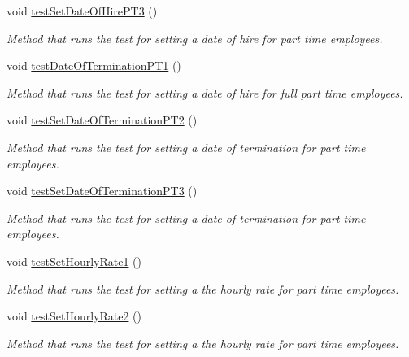 \begin{DoxyCompactItemize}
void \hyperlink{class_all_employees_test_1_1_all_employees_tests_a517c812168390f854eafcf8af167dffc}{test\+Set\+Date\+Of\+Hire\+P\+T3} ()
\begin{DoxyCompactList}\small\item\em Method that runs the test for setting a date of hire for part time employees. \end{DoxyCompactList}\item 
void \hyperlink{class_all_employees_test_1_1_all_employees_tests_a6ff41ba252257f979c0f1671fbd3e192}{test\+Date\+Of\+Termination\+P\+T1} ()
\begin{DoxyCompactList}\small\item\em Method that runs the test for setting a date of hire for full part time employees. \end{DoxyCompactList}\item 
void \hyperlink{class_all_employees_test_1_1_all_employees_tests_af0b6a9f915d0bd257f23ba1813523d3e}{test\+Set\+Date\+Of\+Termination\+P\+T2} ()
\begin{DoxyCompactList}\small\item\em Method that runs the test for setting a date of termination for part time employees. \end{DoxyCompactList}\item 
void \hyperlink{class_all_employees_test_1_1_all_employees_tests_ac5cc024170db503e62fead930ca8ae77}{test\+Set\+Date\+Of\+Termination\+P\+T3} ()
\begin{DoxyCompactList}\small\item\em Method that runs the test for setting a date of termination for part time employees. \end{DoxyCompactList}\item 
void \hyperlink{class_all_employees_test_1_1_all_employees_tests_a475be3e3374a398cb399f1294591062c}{test\+Set\+Hourly\+Rate1} ()
\begin{DoxyCompactList}\small\item\em Method that runs the test for setting a the hourly rate for part time employees. \end{DoxyCompactList}\item 
void \hyperlink{class_all_employees_test_1_1_all_employees_tests_ab084181e1a6efff92a60ff50fbc0cdfa}{test\+Set\+Hourly\+Rate2} ()
\begin{DoxyCompactList}\small\item\em Method that runs the test for setting a the hourly rate for part time employees. \end{DoxyCompactList}\item 

\end{DoxyCompactItemize}
